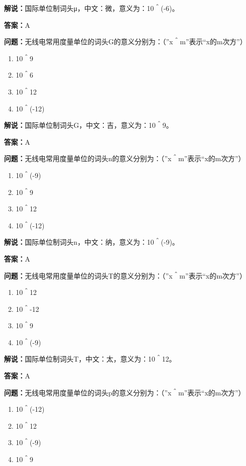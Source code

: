 \textbf{解说：}国际单位制词头μ，中文：微，意义为：10＾(-6)。

\textbf{答案：}A

\textbf{问题：}无线电常用度量单位的词头G的意义分别为：（”x＾m”表示“x的m次方”）

\begin{enumerate}[label=\Alph*), leftmargin=3em]
	\item 10＾9
	\item 10＾6
	\item 10＾12
	\item 10＾(-12)
\end{enumerate}

\textbf{解说：}国际单位制词头G，中文：吉，意义为：10＾9。

\textbf{答案：}A

\textbf{问题：}无线电常用度量单位的词头n的意义分别为：（”x＾m”表示“x的m次方”）

\begin{enumerate}[label=\Alph*), leftmargin=3em]
	\item 10＾(-9)
	\item 10＾9
	\item 10＾12
	\item 10＾(-12)
\end{enumerate}

\textbf{解说：}国际单位制词头n，中文：纳，意义为：10＾(-9)。

\textbf{答案：}A

\textbf{问题：}无线电常用度量单位的词头T的意义分别为：（”x＾m”表示“x的m次方”）

\begin{enumerate}[label=\Alph*), leftmargin=3em]
	\item 10＾12
	\item 10＾-12
	\item 10＾9
	\item 10＾(-9)
\end{enumerate}

\textbf{解说：}国际单位制词头T，中文：太，意义为：10＾12。

\textbf{答案：}A

\textbf{问题：}无线电常用度量单位的词头p的意义分别为：（”x＾m”表示“x的m次方”）

\begin{enumerate}[label=\Alph*), leftmargin=3em]
	\item 10＾(-12)
	\item 10＾12
	\item 10＾(-9)
	\item 10＾9
\end{enumerate}

